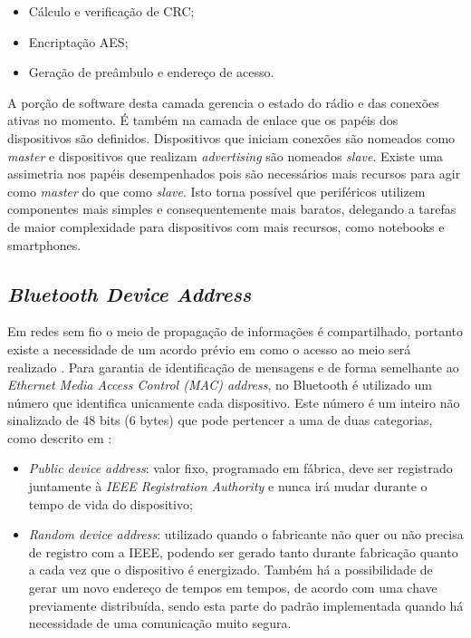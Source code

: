 \documentclass[a5paper]{ufsc-thesis}  %
\begin{document}
\begin{itemize}
    \item Cálculo e verificação de CRC;
    \item Encriptação AES;
    \item Geração de preâmbulo e endereço de acesso.
\end{itemize}

A porção de software desta camada gerencia o estado do rádio e das conexões ativas no momento. É também na camada de enlace que os papéis dos dispositivos são definidos. Dispositivos que iniciam conexões são nomeados como \textit{master} e dispositivos que realizam \textit{advertising} são nomeados \textit{slave}. Existe uma assimetria nos papéis desempenhados pois são necessários mais recursos para agir como \textit{master} do que como \textit{slave}. Isto torna possível que periféricos utilizem componentes mais simples e consequentemente mais baratos, delegando a tarefas de maior complexidade para dispositivos com mais recursos, como notebooks e smartphones.

\subsection{\textit{Bluetooth Device Address}}
Em redes sem fio o meio de propagação de informações é compartilhado, portanto existe a necessidade de um acordo prévio em como o acesso ao meio será realizado \cite{Goldsmith_2020}. Para garantia de identificação de mensagens e de forma semelhante ao \textit{Ethernet Media Access Control (MAC) address}, no Bluetooth é utilizado um número que identifica unicamente cada dispositivo. Este número é um inteiro não sinalizado de 48 bits (6 bytes) que pode pertencer a uma de duas categorias, como descrito em \cite{Townsend_2014}:

\begin{itemize}
    \item \textit{Public device address}: valor fixo, programado em fábrica, deve ser registrado juntamente à \textit{IEEE Registration Authority} e nunca irá mudar durante o tempo de vida do dispositivo;
    \item \textit{Random device address}: utilizado quando o fabricante não quer ou não precisa de registro com a IEEE, podendo ser gerado tanto durante fabricação quanto a cada vez que o dispositivo é energizado. Também há a possibilidade de gerar um novo endereço de tempos em tempos, de acordo com uma chave previamente distribuída, sendo esta parte do padrão implementada quando há necessidade de uma comunicação muito segura.
\end{itemize}
\end{document}
